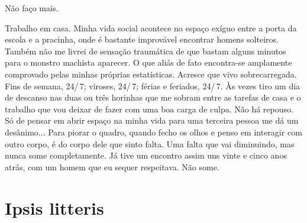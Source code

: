 Não faço mais.

Trabalho em casa. Minha vida social acontece no espaço exíguo entre a
porta da escola e a pracinha, onde é bastante improvável encontrar
homens solteiros. Também não me livrei de sensação traumática de que
bastam alguns minutos para o monstro machista aparecer. O que aliás de
fato encontra-se amplamente comprovado pelas minhas próprias
estatísticas. Acresce que vivo sobrecarregada. Fins de semana, 24/\,7;
viroses, 24/\,7; férias e feriados, 24/\,7. Às vezes tiro um dia de descanso
nas duas ou três horinhas que me sobram entre as tarefas de casa e o
trabalho que vou deixar de fazer com uma boa carga de culpa. Não há
repouso. Só de pensar em abrir espaço na minha vida para uma terceira
pessoa me dá um desânimo... Para piorar o quadro, quando fecho os olhos
e penso em interagir com outro corpo, é do corpo dele que sinto falta.
Uma falta que vai diminuindo, mas nunca some completamente. Já tive um
encontro assim uns vinte e cinco anos atrás, com um homem que eu sequer
respeitava. Não some.

\chapter{Ipsis litteris}

